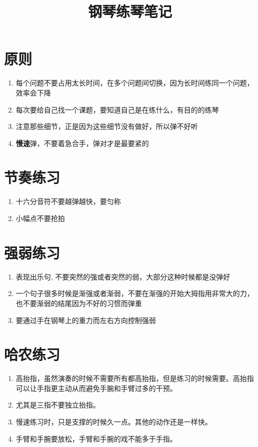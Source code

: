 \documentclass[UTF8]{ctexart}
\title{钢琴练琴笔记}
\begin{document}
\maketitle

\section{原则}

\begin{enumerate}
    \item 每个问题不要占用太长时间，在多个问题间切换，因为长时间练同一个问题，效率会下降
    \item 每次要给自己找一个课题，要知道自己是在练什么，有目的的练琴
    \item 注意那些细节，正是因为这些细节没有做好，所以弹不好听
    \item \textbf{慢速}弹，不要着急合手，弹对才是最要紧的
\end{enumerate}

\section{节奏练习}

\begin{enumerate}
    \item 十六分音符不要越弹越快，要匀称 
    \item 小幅点不要抢拍 
\end{enumerate}


\section{强弱练习}

\begin{enumerate} 
    \item 表现出乐句, 不要突然的强或者突然的弱，大部分这种时候都是没弹好
    \item 一个句子很多时候是渐强或者渐弱，不要在渐强的开始大拇指用非常大的力，也不要渐弱的结尾因为不好的习惯而弹重
    \item 要通过手在钢琴上的重力而左右方向控制强弱 
\end{enumerate}



\section{哈农练习}

\begin{enumerate}
    \item 高抬指，虽然演奏的时候不需要所有都高抬指，但是练习的时候需要。高抬指可以让手指更主动从而避免手腕和手臂过多的干预。
    \item 尤其是三指不要独立抬指。
    \item 慢速练习时，只是支撑的时候久一点。其他的动作还是一样快。
    \item 手臂和手腕要放松，手臂和手腕的戏不能多于手指。
\end{enumerate}
\end{document}
